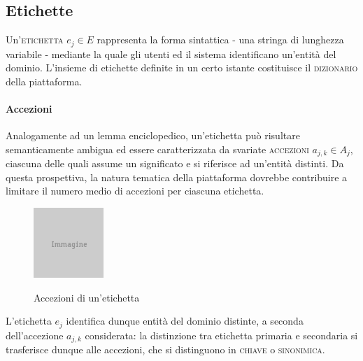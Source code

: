 \subsection{Etichette}
Un'\textsc{etichetta} $e_j \in E$ rappresenta la forma sintattica - una stringa di lunghezza variabile - mediante la quale gli utenti ed il sistema identificano un'entità del dominio. L'insieme di etichette definite in un certo istante costituisce il \textsc{dizionario} della piattaforma.

\paragraph{Accezioni}
Analogamente ad un lemma enciclopedico, un'etichetta può risultare semanticamente ambigua ed essere caratterizzata da svariate \textsc{accezioni} $a_{j,k} \in A_j$, ciascuna delle quali assume un significato e si riferisce ad un'entità distinti. Da questa prospettiva, la natura tematica della piattaforma dovrebbe contribuire a limitare il numero medio di accezioni per ciascuna etichetta.

\begin{figure}[ht]
\begin{center}
\includegraphics{placeholder.png}
\label{fig:tesi:stage:fase-uno:etichette-accezioni}
\caption{Accezioni di un'etichetta}
\end{center}
\end{figure}

L'etichetta $e_j$ identifica dunque entità del dominio distinte, a seconda dell'accezione $a_{j,k}$ considerata: la distinzione tra etichetta primaria e secondaria si trasferisce dunque alle accezioni, che si distinguono in \textsc{chiave} o \textsc{sinonimica}.

